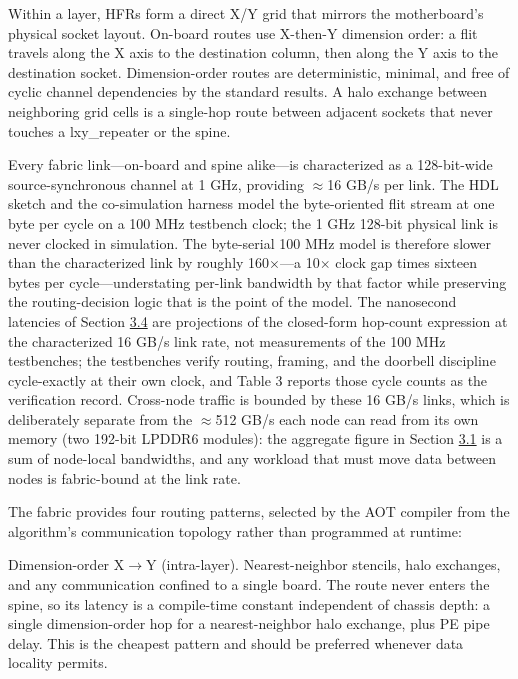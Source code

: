 \documentclass[10pt,twocolumn]{article}
\begin{document}
Within a layer, HFRs form a direct X/Y grid that mirrors the motherboard's physical socket layout. On-board routes use X-then-Y dimension order: a flit travels along the X axis to the destination column, then along the Y axis to the destination socket\cite{13,14}. Dimension-order routes are deterministic, minimal, and free of cyclic channel dependencies by the standard results. A halo exchange between neighboring grid cells is a single-hop route between adjacent sockets that never touches a lxy\_repeater or the spine.

Every fabric link---on-board and spine alike---is characterized as a 128-bit-wide source-synchronous channel at 1 GHz, providing $\approx$16 GB/s per link. The HDL sketch and the co-simulation harness model the byte-oriented flit stream at one byte per cycle on a 100 MHz testbench clock; the 1 GHz 128-bit physical link is never clocked in simulation. The byte-serial 100 MHz model is therefore slower than the characterized link by roughly 160$\times$---a 10$\times$ clock gap times sixteen bytes per cycle---understating per-link bandwidth by that factor while preserving the routing-decision logic that is the point of the model. The nanosecond latencies of Section \hyperref[sec:3.4]{3.4} are projections of the closed-form hop-count expression at the characterized 16 GB/s link rate, not measurements of the 100 MHz testbenches; the testbenches verify routing, framing, and the doorbell discipline cycle-exactly at their own clock, and Table 3 reports those cycle counts as the verification record. Cross-node traffic is bounded by these 16 GB/s links, which is deliberately separate from the $\approx$512 GB/s each node can read from its own memory (two 192-bit LPDDR6 modules): the aggregate figure in Section \hyperref[sec:3.1]{3.1} is a sum of node-local bandwidths, and any workload that must move data between nodes is fabric-bound at the link rate.

The fabric provides four routing patterns, selected by the AOT compiler from the algorithm's communication topology rather than programmed at runtime:

Dimension-order X$\rightarrow$Y (intra-layer). Nearest-neighbor stencils, halo exchanges, and any communication confined to a single board. The route never enters the spine, so its latency is a compile-time constant independent of chassis depth: a single dimension-order hop for a nearest-neighbor halo exchange, plus PE pipe delay. This is the cheapest pattern and should be preferred whenever data locality permits.
\end{document}
